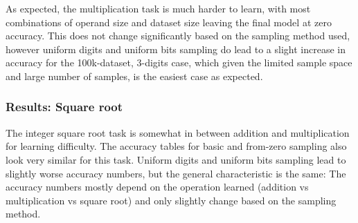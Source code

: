 As expected, the multiplication task is much harder to learn, with most combinations of operand size and dataset size leaving the final model at zero accuracy. This does not change significantly based on the sampling method used, however uniform digits and uniform bits sampling do lead to a  slight increase in accuracy for the 100k-dataset, 3-digits case, which given the limited sample space and large number of samples, is the easiest case as expected.

\subsubsection{Results: Square root}


\begin{table}[H]
    \begin{minipage}[t]{0.47\linewidth}
        \hfill
    \end{minipage}
    \hfill
    \begin{minipage}[t]{0.47\linewidth}
        \hfill
    \end{minipage}

    \vspace{0.5cm}
    \begin{minipage}[t]{0.47\linewidth}
        \hfill
    \end{minipage}
    \hfill
    \begin{minipage}[t]{0.47\linewidth}
        \hfill
    \end{minipage}
    \label{tbl:sampling_strategies_sqrt}
\end{table}

The integer square root task is somewhat in between addition and multiplication  for learning difficulty. The accuracy tables for basic and from-zero sampling also look very similar for this task.  Uniform digits and uniform bits sampling lead to slightly worse accuracy numbers, but the general characteristic is the same: The accuracy numbers mostly depend on the operation learned (addition vs multiplication vs square root) and only slightly change based on the sampling method.


